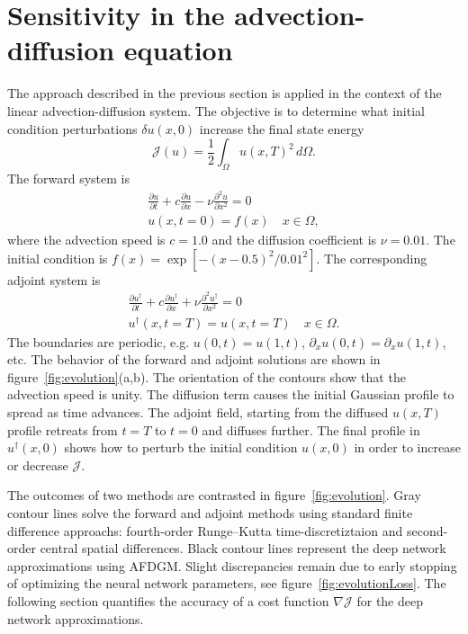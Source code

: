 \documentclass{jfm}
\begin{document}
\section{Sensitivity in the advection-diffusion equation}
The approach described in the previous section is applied in the context of the linear advection-diffusion system. The objective is to determine what initial condition perturbations $\delta u(x,0)$ increase the final state energy
\begin{equation}
    \mathcal{J}(u) = \frac{1}{2} \int_\Omega u(x,T)^2\,d\Omega.
\end{equation}
The forward system is
\begin{align}
    \frac{\partial u}{\partial t} + c \frac{\partial u}{\partial x} - \nu \frac{\partial^2 u}{\partial x^2} = 0 \\
    u(x,t=0)=f(x) \quad x \in \Omega,
\end{align}
where the advection speed is $c=1.0$ and the diffusion coefficient is $\nu=0.01$. The initial condition is $f(x)=\exp\left[-(x-0.5)^2/0.01^2 \right]$.  The corresponding adjoint system is
\begin{align}
    \frac{\partial u^\dagger}{\partial t} + c \frac{\partial u^\dagger}{\partial x} + \nu \frac{\partial^2 u^\dagger}{\partial x^2} = 0 \\
    u^\dagger(x,t=T)=u(x,t=T) \quad x \in \Omega.
\end{align}
The boundaries are periodic, e.g. $u(0,t)=u(1,t)$, $\partial_x u(0,t)=\partial_x u(1,t)$, etc. The behavior of the forward and adjoint solutions are shown in figure~\ref{fig:evolution}(a,b). The orientation of the contours show that the advection speed is unity.  The diffusion term causes the initial Gaussian profile to spread as time advances.  The adjoint field, starting from the diffused $u(x,T)$ profile retreats from $t=T$ to $t=0$ and diffuses further.  The final profile in $u^\dagger(x,0)$ shows how to perturb the initial condition $u(x,0)$ in order to increase or decrease $\mathcal{J}$. 

The outcomes of two methods are contrasted in figure~\ref{fig:evolution}.  Gray contour lines solve the forward and adjoint methods using standard finite difference approachs: fourth-order Runge--Kutta time-discretiztaion and second-order central spatial differences.  Black contour lines represent the deep network approximations using AFDGM.   Slight discrepancies remain due to early stopping of optimizing the neural network parameters, see figure~\ref{fig:evolutionLoss}. The following section quantifies the accuracy of a cost function $\nabla \mathcal{J}$ for the deep network approximations.
\end{document}

